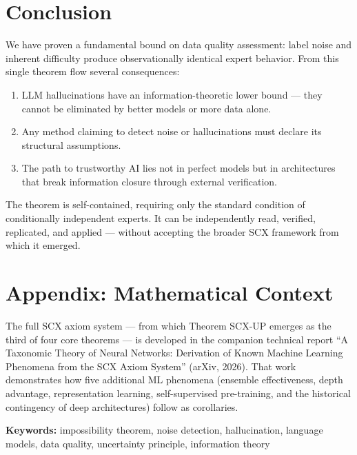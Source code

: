 \documentclass[12pt,a4paper]{article}
\theoremstyle{definition}
\theoremstyle{remark}
\begin{document}
\section{Conclusion}

We have proven a fundamental bound on data quality assessment: label noise and inherent difficulty produce observationally identical expert behavior. From this single theorem flow several consequences:

\begin{enumerate}
\item LLM hallucinations have an information-theoretic lower bound — they cannot be eliminated by better models or more data alone.
\item Any method claiming to detect noise or hallucinations must declare its structural assumptions.
\item The path to trustworthy AI lies not in perfect models but in architectures that break information closure through external verification.
\end{enumerate}

The theorem is self-contained, requiring only the standard condition of conditionally independent experts. It can be independently read, verified, replicated, and applied — without accepting the broader SCX framework from which it emerged.

\section*{Appendix: Mathematical Context}

The full SCX axiom system — from which Theorem SCX-UP emerges as the third of four core theorems — is developed in the companion technical report ``A Taxonomic Theory of Neural Networks: Derivation of Known Machine Learning Phenomena from the SCX Axiom System'' (arXiv, 2026). That work demonstrates how five additional ML phenomena (ensemble effectiveness, depth advantage, representation learning, self-supervised pre-training, and the historical contingency of deep architectures) follow as corollaries.

\bigskip
\noindent\textbf{Keywords:} impossibility theorem, noise detection, hallucination, language models, data quality, uncertainty principle, information theory

\end{document}
